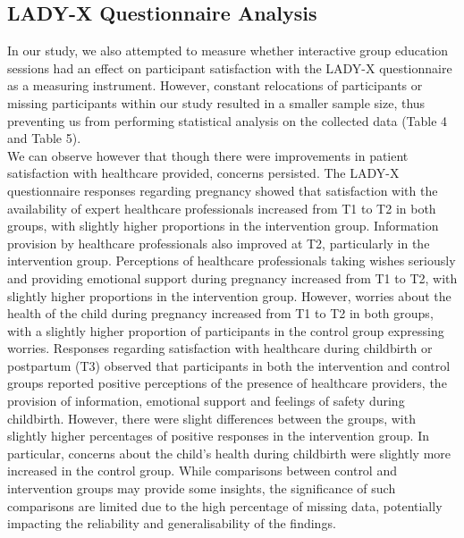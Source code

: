 \documentclass[12pt]{article}
\begin{document}
\subsection{LADY-X Questionnaire Analysis}
\noindent In our study, we also attempted to measure whether interactive group education sessions had an effect on participant satisfaction with the LADY-X questionnaire as a measuring instrument. However, constant relocations of participants or missing participants within our study resulted in a smaller sample size, thus preventing us from performing statistical analysis on the collected data (Table 4 and Table 5). \\

\noindent We can observe however that though there were improvements in patient satisfaction with healthcare provided, concerns persisted. The LADY-X questionnaire responses regarding pregnancy showed that satisfaction with the availability of expert healthcare professionals increased from T1 to T2 in both groups, with slightly higher proportions in the intervention group. Information provision by healthcare professionals also improved at T2, particularly in the intervention group. Perceptions of healthcare professionals taking wishes seriously and providing emotional support during pregnancy increased from T1 to T2, with slightly higher proportions in the intervention group. However, worries about the health of the child during pregnancy increased from T1 to T2 in both groups, with a slightly higher proportion of participants in the control group expressing worries. 
\noindent Responses regarding satisfaction with healthcare during childbirth or postpartum (T3) observed 
that participants in both the intervention and control groups reported positive perceptions of the presence of healthcare providers, the provision of information, emotional support and feelings of safety during childbirth. However, there were slight differences between the groups, with slightly higher percentages of positive responses in the intervention group. In particular, concerns about the child's health during childbirth were slightly more increased in the control group.
\noindent While comparisons between control and intervention groups may provide some insights, the significance of such comparisons are limited due to the high percentage of missing data, potentially impacting the reliability and generalisability of the findings.
\end{document}
